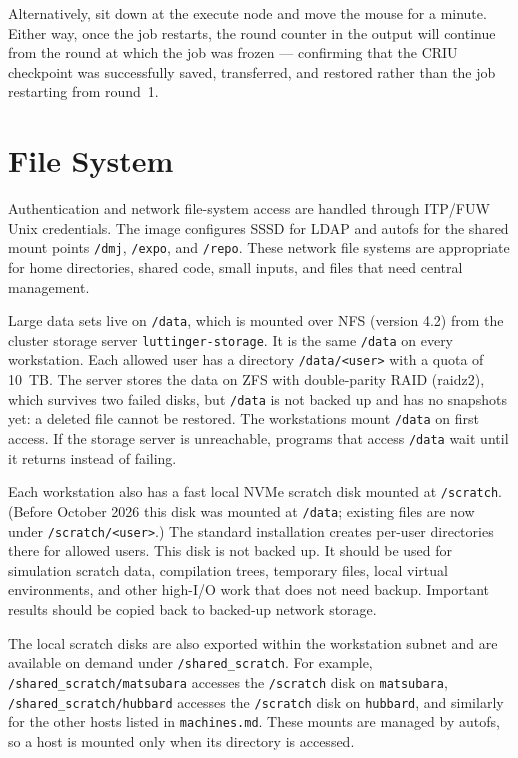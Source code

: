 \documentclass[11pt,a4paper]{article}
\begin{document}
Alternatively, sit down at the execute node and move the mouse for a minute.
Either way, once the job restarts, the round counter in the output will continue
from the round at which the job was frozen --- confirming that the CRIU
checkpoint was successfully saved, transferred, and restored rather than the job
restarting from round~1.

\section{File System}
\label{sec:fs}

Authentication and network file-system access are handled through ITP/FUW Unix
credentials.  The image configures SSSD for LDAP and autofs for the shared
mount points \texttt{/dmj}, \texttt{/expo}, and \texttt{/repo}.
These network file systems are appropriate for home directories, shared code,
small inputs, and files that need central management.

Large data sets live on \texttt{/data}, which is mounted over NFS (version
4.2) from the cluster storage server \texttt{luttinger-storage}.  It is the
same \texttt{/data} on every workstation.  Each allowed user has a directory
\texttt{/data/<user>} with a quota of 10~TB.  The server stores the data on
ZFS with double-parity RAID (raidz2), which survives two failed disks, but
\texttt{/data} is not backed up and has no snapshots yet: a deleted file
cannot be restored.  The workstations mount \texttt{/data} on first access.
If the storage server is unreachable, programs that access \texttt{/data} wait
until it returns instead of failing.

Each workstation also has a fast local NVMe scratch disk mounted at
\texttt{/scratch}.  (Before October 2026 this disk was mounted at
\texttt{/data}; existing files are now under \texttt{/scratch/<user>}.)  The
standard installation creates per-user directories there for allowed users.
This disk is not backed up.  It should be used for
simulation scratch data, compilation trees, temporary files, local virtual
environments, and other high-I/O work that does not need backup.  Important
results should be copied back to backed-up network storage.

The local scratch disks are also exported within the workstation subnet and are
available on demand under \texttt{/shared\_scratch}.  For example,
\texttt{/shared\_scratch/matsubara} accesses the \texttt{/scratch} disk on
\texttt{matsubara}, \texttt{/shared\_scratch/hubbard} accesses the \texttt{/scratch}
disk on \texttt{hubbard}, and similarly for the other hosts listed in
\texttt{machines.md}.  These mounts are managed by autofs, so a host is mounted
only when its directory is accessed.
\end{document}
